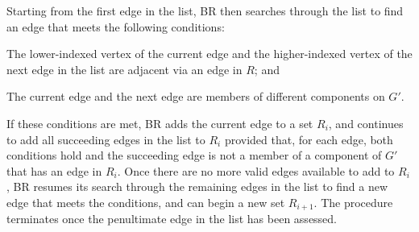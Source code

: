 \documentclass[oribibl]{llncs}
\begin{document}
Starting from the first edge in the list, BR then searches through the list to find an edge that meets the following conditions: 
\begin{enumerate*}[label={(\alph*)}]
	\item The lower-indexed vertex of the current edge and the higher-indexed vertex of the next edge in the list are adjacent via an edge in $R$; and
	\item The current edge and the next edge are members of different components on $G'$.
\end{enumerate*}
If these conditions are met, BR adds the current edge to a set $R_i$, and continues to add all succeeding edges in the list to $R_i$ provided that, for each edge, both conditions hold and the succeeding edge is not a member of a component of $G'$ that has an edge in $R_i$. Once there are no more valid edges available to add to $R_i$, BR resumes its search through the remaining edges in the list to find a new edge that meets the conditions, and can begin a new set $R_{i+1}$. The procedure terminates once the penultimate edge in the list has been assessed.
\end{document}
